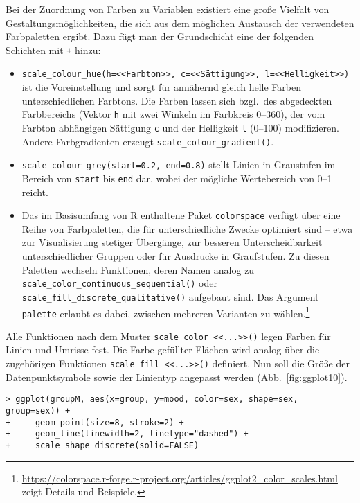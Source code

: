 Bei der Zuordnung von Farben zu Variablen existiert eine große Vielfalt von Gestaltungsmöglichkeiten, die sich aus dem möglichen Austausch der verwendeten Farbpaletten ergibt. Dazu fügt man der Grundschicht eine der folgenden Schichten mit \lstinline!+! hinzu:
\begin{itemize}
\item {} \lstinline!scale_colour_hue(h=<<Farbton>>, c=<<Sättigung>>, l=<<Helligkeit>>)! ist die Voreinstellung und sorgt für annähernd gleich helle Farben unterschiedlichen Farbtons. Die Farben lassen sich bzgl.\ des abgedeckten Farbbereichs (Vektor \lstinline!h! mit zwei Winkeln im Farbkreis 0--360), der vom Farbton abhängigen Sättigung \lstinline!c! und der Helligkeit \lstinline!l! (0--100) modifizieren. Andere Farbgradienten erzeugt  \lstinline!scale_colour_gradient()!.
\item {} \lstinline!scale_colour_grey(start=0.2, end=0.8)! stellt Linien in Graustufen im Bereich von \lstinline!start! bis \lstinline!end! dar, wobei der mögliche Wertebereich von 0--1 reicht.
\item Das im Basisumfang von R enthaltene Paket  \lstinline!colorspace! verfügt über eine Reihe von Farbpaletten, die für unterschiedliche Zwecke optimiert sind -- etwa zur Visualisierung stetiger Übergänge, zur besseren Unterscheidbarkeit unterschiedlicher Gruppen oder für Ausdrucke in Graufstufen. Zu diesen Paletten wechseln Funktionen, deren Namen analog zu  \lstinline!scale_color_continuous_sequential()! oder  \lstinline!scale_fill_discrete_qualitative()! aufgebaut sind. Das Argument \lstinline!palette! erlaubt es dabei, zwischen mehreren Varianten zu wählen.\footnote{\url{https://colorspace.r-forge.r-project.org/articles/ggplot2_color_scales.html} zeigt Details und Beispiele.}
\end{itemize}

Alle Funktionen nach dem Muster \lstinline!scale_color_<<...>>()! legen Farben für Linien und Umrisse fest. Die Farbe gefüllter Flächen wird analog über die zugehörigen Funktionen \lstinline!scale_fill_<<...>>()! definiert. Nun soll die Größe der Datenpunktsymbole sowie der Linientyp angepasst werden (Abb.\ \ref{fig:ggplot10}).
\begin{lstlisting}
> ggplot(groupM, aes(x=group, y=mood, color=sex, shape=sex, group=sex)) +
+     geom_point(size=8, stroke=2) +
+     geom_line(linewidth=2, linetype="dashed") +
+     scale_shape_discrete(solid=FALSE)
\end{lstlisting}

